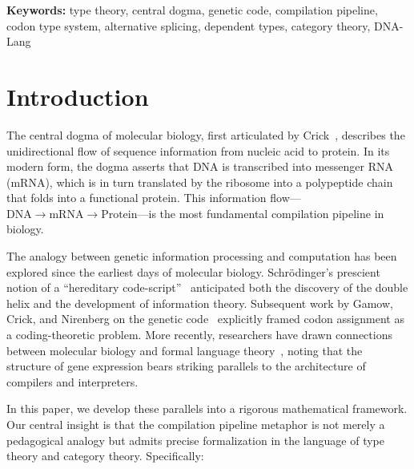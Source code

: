 \documentclass[12pt,a4paper]{article}
\theoremstyle{definition}
\begin{document}
\vspace{6pt}
\noindent\textbf{Keywords:} type theory, central dogma, genetic code, compilation pipeline, codon type system, alternative splicing, dependent types, category theory, DNA-Lang

\tableofcontents
\newpage

\section{Introduction}\label{sec:introduction}

The central dogma of molecular biology, first articulated by Crick~\cite{crick1958,crick1970}, describes the unidirectional flow of sequence information from nucleic acid to protein.
In its modern form, the dogma asserts that DNA is transcribed into messenger RNA (mRNA), which is in turn translated by the ribosome into a polypeptide chain that folds into a functional protein.
This information flow---$\text{DNA} \to \text{mRNA} \to \text{Protein}$---is the most fundamental compilation pipeline in biology.

The analogy between genetic information processing and computation has been explored since the earliest days of molecular biology.
Schr\"{o}dinger's prescient notion of a ``hereditary code-script''~\cite{schrodinger1944} anticipated both the discovery of the double helix and the development of information theory.
Subsequent work by Gamow, Crick, and Nirenberg on the genetic code~\cite{nirenberg1961} explicitly framed codon assignment as a coding-theoretic problem.
More recently, researchers have drawn connections between molecular biology and formal language theory~\cite{searls2002}, noting that the structure of gene expression bears striking parallels to the architecture of compilers and interpreters.

In this paper, we develop these parallels into a rigorous mathematical framework.
Our central insight is that the compilation pipeline metaphor is not merely a pedagogical analogy but admits precise formalization in the language of type theory and category theory.
Specifically:
\end{document}
